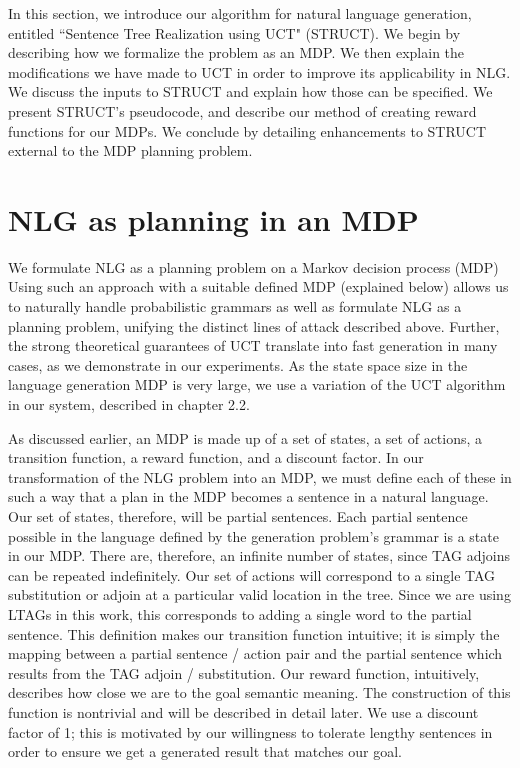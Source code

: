 In this section, we introduce our algorithm for natural language generation,
entitled ``Sentence Tree Realization using UCT" (STRUCT).  We begin
by describing how we formalize the problem as an MDP.  We then explain
the modifications we have made to UCT in order to improve
its applicability in NLG.  We discuss the inputs to STRUCT and explain
how those can be specified.  We present STRUCT's pseudocode, and describe
our method of creating reward functions for our MDPs.  We conclude by detailing
enhancements to STRUCT external to the MDP planning problem.

\section{NLG as planning in an MDP}
We formulate NLG as a planning problem on a Markov decision process
(MDP)  Using such an approach with a suitable defined MDP
(explained below) allows us to naturally handle
probabilistic grammars as well as formulate NLG as a planning problem,
unifying the distinct lines of attack described above. Further, the
strong theoretical guarantees of UCT translate into fast generation in
many cases, as we demonstrate in our experiments.
As the state space size in the language generation MDP is
very large, we use a variation of the UCT algorithm in our system,
described in chapter 2.2.

As discussed earlier, an MDP is made up of a set of states, a set of
actions, a transition function, a reward function, and a discount factor.
In our transformation of the NLG problem into an MDP, we must define
each of these in such a way that a plan in the MDP becomes a sentence
in a natural language.  Our set of states, therefore, will be partial
sentences.  Each partial sentence possible in the language defined by
the generation problem's grammar is a state in our MDP.  There are,
therefore, an infinite number of states, since TAG adjoins can be
repeated indefinitely.  Our set of actions will correspond to a single
TAG substitution or adjoin at a particular valid location in the tree.
Since we are using LTAGs in this work,
this corresponds to adding a single word to the partial sentence.
This definition makes our transition function intuitive; it is simply the
mapping between a partial sentence / action pair and the partial
sentence which results from the TAG adjoin / substitution.
Our reward function, intuitively, describes how close we are
to the goal semantic meaning.  The construction of this function
is nontrivial and will be described in detail later.  We use a
discount factor of 1; this is motivated by our willingness to tolerate
lengthy sentences in order to ensure we get a generated result
that matches our goal.

